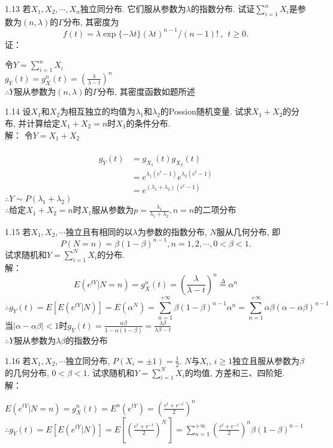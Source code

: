 1.13 若$X_1, X_2,\cdots, X_n$独立同分布. 它们服从参数为$\lambda$的指数分布. 试证$\sum\limits^n_{i=1}X_i$是参数为$(n, \lambda)$的$\Gamma$分布, 其密度为
	\[
	f(t) = \lambda \exp\{-\lambda t\}(\lambda t)^{n-1}/(n-1)!~,~~t \geqslant 0.
	\]
证：
	\begin{flushleft}
	令$Y = \sum\limits^n_{i=1}X_i$\\
	$g_Y(t) = g^n_X(t) = \left(\frac{\lambda}{\lambda - t}\right)^n$\\
	$\therefore Y$服从参数为$(n, \lambda)$的$\Gamma$分布, 其密度函数如题所述\\
	\end{flushleft}


1.14 设$X_1$和$X_2$为相互独立的均值为${\lambda}_1$和${\lambda}_2$的Possion随机变量. 试求$X_1+X_2$的分布, 并计算给定$X_1+X_2 = n$时$X_1$的条件分布.\\
解：
	令$Y = X_1+X_2$\\\
	\begin{align*}
	g_Y(t) & = g_{X_1}(t)g_{X_2}(t)\\
			& = e^{{\lambda}_1(e^t-1)}e^{{\lambda}_2(e^t-1)}\\
			& = e^{({\lambda}_1 + {\lambda}_2)(e^t-1)}
	\end{align*}
	$\therefore Y \sim P({\lambda}_1+{\lambda}_2)$\\
	$\therefore $给定$X_1+X_2 = n$时$X_1$服从参数为$p = \frac{{\lambda}_1}{{\lambda}_1 + {\lambda}_2}, n = n$的二项分布 


1.15 若$X_1, X_2,\cdots $独立且有相同的以$\lambda$为参数的指数分布, $N$服从几何分布, 即
	\[
	P(N = n) = \beta(1-\beta)^{n-1}, n = 1,2,\cdots, 0<\beta<1.
	\]
试求随机和$Y = \sum\limits^N_{i=1}X_i$的分布.\\
解：
	\[
	E(e^{tY} | N = n) = g^n_X (t) = \left(\frac{\lambda}{\lambda - t}\right)^n \overset{\Delta}{=} {\alpha}^n 
	\]
	\[
	\therefore g_Y(t) = E[E(e^{tY}|N)] = E({\alpha}^N) = \sum^{+\infty}_{n=1}\beta(1-\beta)^{n-1}{\alpha}^n = \sum^{+\infty}_{n=1}\alpha\beta(\alpha-\alpha\beta)^{n-1}
	\]
	当$|\alpha -\alpha\beta|<1$时$g_Y(t)=\frac{\alpha\beta}{1-\alpha(1-\beta)} = \frac{\lambda\beta}{\lambda\beta - t}$\\
	$\therefore Y$服从参数为$\lambda\beta$的指数分布


1.16 若$X_1, X_2, \cdots$独立同分布, $P(X_i = \pm 1) = \frac{1}{2}$. $N$与$X_i$, $i \geqslant 1$独立且服从参数为$\beta$的几何分布, $0 < \beta < 1$. 试求随机和$Y = \sum\limits^N_{i=1} X_i$的均值, 方差和三、四阶矩.\\
解：
	\begin{center}
	$E(e^{tY} | N = n) = g^n_X (t) = E^n(e^{tY}) = {\left(\frac{e^t + e^{-t}}{2}\right)}^n$\\
	$\therefore g_Y(t) = E \left[ E(e^{tY} | N)\right] = E \left[ {\left(\frac{e^t + e^{-t}}{2}\right)}^N\,\right] = \sum\limits^{+\infty}_{n=1}{\left(\frac{e^t + e^{-t}}{2}\right)}^n \beta (1 - \beta)^{n - 1}$
	\end{center}


